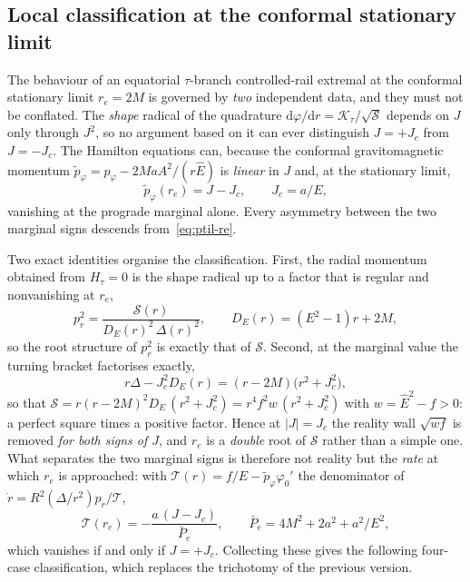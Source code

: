 \documentclass[12pt]{iopart}
\theoremstyle{plain}
\theoremstyle{definition}
\theoremstyle{remark}
\newcommand{\Ehat}{\hat E}
\newcommand{\re}{r_{e}}
\newcommand{\Jc}{J_{c}}
\newcommand{\dd}{\mathrm{d}}
\begin{document}
\subsection{Local classification at the conformal stationary limit}
\label{sec:trichotomy}
The behaviour of an equatorial $\tau$-branch controlled-rail extremal at the
conformal stationary limit $\re=2M$ is governed by \emph{two} independent data,
and they must not be conflated. The \emph{shape} radical of the quadrature
$\dd\varphi/\dd r=\mathcal K_\tau/\sqrt{\mathcal S}$ depends on $J$ only through
$J^2$, so no argument based on it can ever distinguish $J=+\Jc$ from $J=-\Jc$.
The Hamilton equations can, because the conformal gravitomagnetic momentum
$\tilde p_\varphi=p_\varphi-2MaA^2/(r\Ehat)$ is \emph{linear} in $J$ and, at the
stationary limit,
\begin{equation}
    \tilde p_\varphi(\re)=J-\Jc,\qquad \Jc=a/E,
    \label{eq:ptil-re}
\end{equation}
vanishing at the prograde marginal alone. Every asymmetry between the two
marginal signs descends from~\eqref{eq:ptil-re}.

Two exact identities organise the classification. First, the radial momentum
obtained from $H_\tau=0$ is the shape radical up to a factor that is regular and
nonvanishing at $\re$,
\begin{equation}
    p_r^2=\frac{\mathcal S(r)}{D_E(r)^2\,\Delta(r)^2},
    \qquad D_E(r)=(E^2-1)r+2M ,
    \label{eq:pr2-S}
\end{equation}
so the root structure of $p_r^2$ is exactly that of $\mathcal S$. Second, at the
marginal value the turning bracket factorises exactly,
\begin{equation}
    r\Delta-\Jc^2 D_E(r)=(r-2M)\big(r^2+\Jc^2\big),
    \label{eq:marginal-factor}
\end{equation}
so that $\mathcal S=r(r-2M)^2D_E\,(r^2+\Jc^2)=r^4f^2w\,(r^2+\Jc^2)$ with
$w=\Ehat^2-f>0$: a perfect square times a positive factor. Hence at $|J|=\Jc$
the reality wall $\sqrt{wf}$ is removed \emph{for both signs of $J$}, and $\re$
is a \emph{double} root of $\mathcal S$ rather than a simple one. What separates
the two marginal signs is therefore not reality but the \emph{rate} at which
$\re$ is approached: with
$\mathcal T(r)=f/E-\tilde p_\varphi\varphi_0'$ the denominator of
$\dot r=R^2(\Delta/r^2)p_r/\mathcal T$,
\begin{equation}
    \mathcal T(\re)=-\frac{a\,(J-\Jc)}{\bar P_e},
    \qquad \bar P_e=4M^2+2a^2+a^2/E^2 ,
    \label{eq:T-at-re}
\end{equation}
which vanishes if and only if $J=+\Jc$. Collecting these gives the following
four-case classification, which replaces the trichotomy of the previous version.
\end{document}

